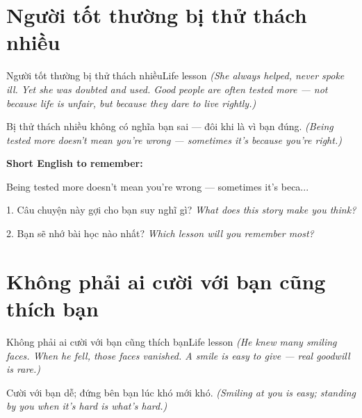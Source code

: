 \section{Người tốt thường bị thử thách nhiều}
\begin{truyen}{Người tốt thường bị thử thách nhiều}{Life lesson}
\textit{(She always helped, never spoke ill. Yet she was doubted and used. Good people are often tested more — not because life is unfair, but because they dare to live rightly.)}
\end{truyen}

\begin{baihoc}
Bị thử thách nhiều không có nghĩa bạn sai — đôi khi là vì bạn đúng.
\textit{(Being tested more doesn't mean you're wrong — sometimes it's because you're right.)}
\end{baihoc}

\begin{ghinhoanh}
\textbf{Short English to remember:}

Being tested more doesn't mean you're wrong — sometimes it's beca...

\end{ghinhoanh}

\begin{tuhocnhanh}
1. Câu chuyện này gợi cho bạn suy nghĩ gì? \textit{What does this story make you think?}

2. Bạn sẽ nhớ bài học nào nhất? \textit{Which lesson will you remember most?}
\end{tuhocnhanh}
\ngancach


\section{Không phải ai cười với bạn cũng thích bạn}
\begin{truyen}{Không phải ai cười với bạn cũng thích bạn}{Life lesson}
\textit{(He knew many smiling faces. When he fell, those faces vanished. A smile is easy to give — real goodwill is rare.)}
\end{truyen}

\begin{baihoc}
Cười với bạn dễ; đứng bên bạn lúc khó mới khó.
\textit{(Smiling at you is easy; standing by you when it's hard is what's hard.)}
\end{baihoc}

